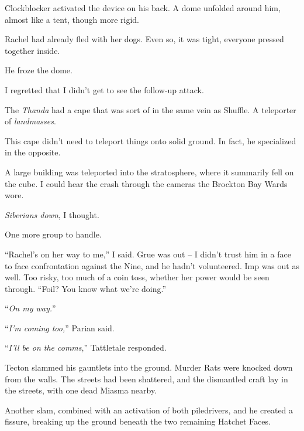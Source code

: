 Clockblocker activated the device on his back.  A dome unfolded around him, almost like a tent, though more rigid.



Rachel had already fled with her dogs.  Even so, it was tight, everyone pressed together inside.



He froze the dome.



I regretted that I didn't get to see the follow-up attack.



The \emph{Thanda} had a cape that was sort of in the same vein as Shuffle.  A teleporter of \emph{landmasses}.



This cape didn't need to teleport things onto solid ground.  In fact, he specialized in the opposite.



A large building was teleported into the stratosphere, where it summarily fell on the cube.  I could hear the crash through the cameras the Brockton Bay Wards wore.



\emph{Siberians down}, I thought.



One more group to handle.



``Rachel's on her way to me,'' I said.  Grue was out – I didn't trust him in a face to face confrontation against the Nine, and he hadn't volunteered.  Imp was out as well.  Too risky, too much of a coin toss, whether her power would be seen through.  ``Foil?  You know what we're doing.''



``\emph{On my way.}''



``\emph{I'm coming too,}'' Parian said.



``\emph{I'll be on the comms},'' Tattletale responded.



\blacksquare



Tecton slammed his gauntlets into the ground.  Murder Rats were knocked down from the walls.  The streets had been shattered, and the dismantled craft lay in the streets, with one dead Miasma nearby.



Another slam, combined with an activation of both piledrivers, and he created a fissure, breaking up the ground beneath the two remaining Hatchet Faces.



